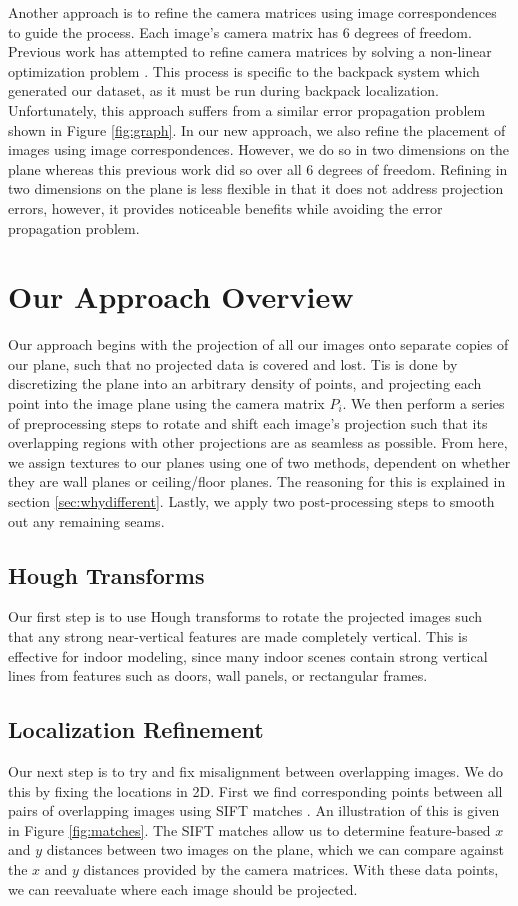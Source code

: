 \documentclass[10pt,twocolumn,letterpaper]{article}
\begin{document}
Another approach is to refine the camera matrices using image
correspondences to guide the process. Each image's camera matrix has 6
degrees of freedom. Previous work has attempted to refine camera
matrices by solving a non-linear optimization problem
\cite{liu2010indoor}. This process is specific to the backpack system
which generated our dataset, as it must be run during backpack
localization\cite{liu2010indoor,chen2010indoor}. Unfortunately, this
approach suffers from a similar error propagation problem shown in
Figure \ref{fig:graph}. In our new approach, we also refine the
placement of images using image correspondences. However, we do so in
two dimensions on the plane whereas this previous work did so over all
6 degrees of freedom. Refining in two dimensions on the plane is less
flexible in that it does not address projection errors, however, it
provides noticeable benefits while avoiding the error propagation
problem.


\section{Our Approach Overview}
Our approach begins 
with the projection of all our images onto
separate copies of our plane, such that no projected data is covered
and lost. Tis is done by discretizing the plane into an arbitrary density of points, and projecting each point into the image plane using the camera matrix $P_i$. We then perform a series of preprocessing steps to rotate
and shift each image's projection such that its overlapping regions
with other projections are as seamless as possible. From here, we assign textures to our planes
using one of two methods, dependent on whether they are wall planes or
ceiling/floor planes. The reasoning for this is explained in section
\ref{sec:whydifferent}. Lastly, we apply two post-processing steps to smooth out
any remaining seams.

\subsection{Hough Transforms}
Our first step is to use Hough transforms to rotate
the projected images such that any strong near-vertical features are made completely vertical. This is effective for indoor modeling, since many indoor
scenes contain strong vertical lines from features such as doors, wall
panels, or rectangular frames.


\subsection{Localization Refinement}
Our next step is to try and fix misalignment between overlapping images.
We do this by fixing
the locations in 2D. First we find corresponding points between all
pairs of overlapping images using SIFT matches
\cite{lowe1999object}. An illustration of this is given in Figure
\ref{fig:matches}. The SIFT matches allow us to determine feature-based $x$ and $y$ distances between two images on the plane, which we can compare against the $x$ and $y$ distances provided by the camera matrices. With these data points, we can reevaluate where each image should be projected.
\end{document}
